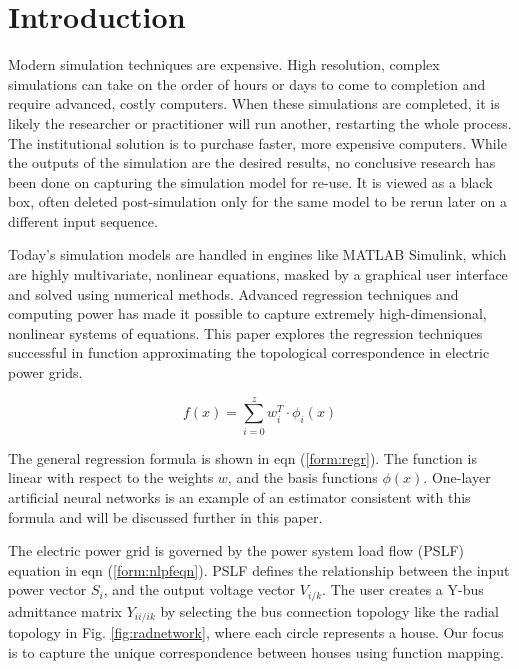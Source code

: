 \documentclass[conference]{IEEEtran}
\begin{document}
%
\IEEEpeerreviewmaketitle


\section{Introduction}
\label{sec:intro}
Modern simulation techniques are expensive. High resolution, complex simulations can take on the order of hours or days to come to completion and require advanced, costly computers. When these simulations are completed, it is likely the researcher or practitioner will run another, restarting the whole process. The institutional solution is to purchase faster, more expensive computers. While the outputs of the simulation are the desired results, no conclusive research has been done on capturing the simulation model for re-use. It is viewed as a black box, often deleted post-simulation only for the same model to be rerun later on a different input sequence.

Today's simulation models are handled in engines like MATLAB Simulink, which are highly multivariate, nonlinear equations, masked by a graphical user interface and solved using numerical methods. Advanced regression techniques and computing power has made it possible to capture extremely high-dimensional, nonlinear systems of equations. This paper explores the regression techniques successful in function approximating the topological correspondence in electric power grids.

\begin{equation} f(x) = \sum_{i =0}^{z}w_{i}^{T} \cdot \phi_{i}(x) \label{form:regr} \end{equation} 

The general regression formula is shown in eqn (\ref{form:regr}). The function is linear with respect to the weights $w$, and the basis functions $\phi(x)$. One-layer artificial neural networks is an example of an estimator consistent with this formula and will be discussed further in this paper.

The electric power grid is governed by the power system load flow (PSLF) equation in eqn (\ref{form:nlpfeqn}). PSLF defines the relationship between the input power vector $S_{i}$, and the output voltage vector $V_{i/k}$. The user creates a Y-bus admittance matrix $Y_{ii/ik}$ by selecting the bus connection topology like the radial topology in Fig. \ref{fig:radnetwork}, where each circle represents a house. Our focus is to capture the unique correspondence between houses using function mapping.
\end{document}
